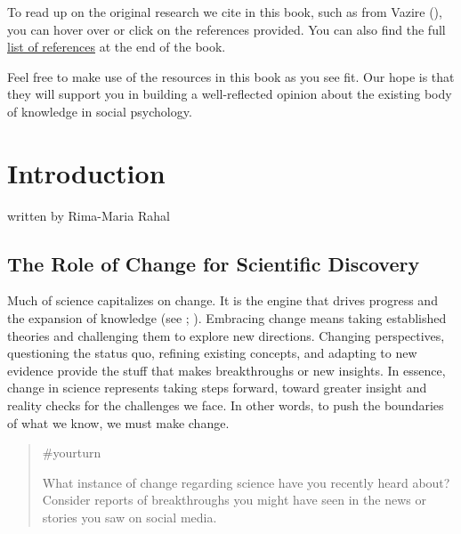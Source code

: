 \documentclass[
  letterpaper,
]{book}
\begin{document}
To read up on the original research we cite in this book, such as from
Vazire (), you can hover over or click on
the references provided. You can also find the full
\href{references.qmd}{list of references} at the end of the book.

Feel free to make use of the resources in this book as you see fit. Our
hope is that they will support you in building a well-reflected opinion
about the existing body of knowledge in social psychology.


\chapter*{\texorpdfstring{{Introduction}}{Introduction}}\label{introduction}


{written by Rima-Maria Rahal}

\section*{The Role of Change for Scientific
Discovery}\label{the-role-of-change-for-scientific-discovery}


Much of science capitalizes on change. It is the engine that drives
progress and the expansion of knowledge (see
;
). Embracing change means
taking established theories and challenging them to explore new
directions. Changing perspectives, questioning the status quo, refining
existing concepts, and adapting to new evidence provide the stuff that
makes breakthroughs or new insights. In essence, change in science
represents taking steps forward, toward greater insight and reality
checks for the challenges we face. In other words, to push the
boundaries of what we know, we must make change.

\begin{quote}
{\#yourturn}

What instance of change regarding science have you recently heard about?
Consider reports of breakthroughs you might have seen in the news or
stories you saw on social media.
\end{quote}
\end{document}
